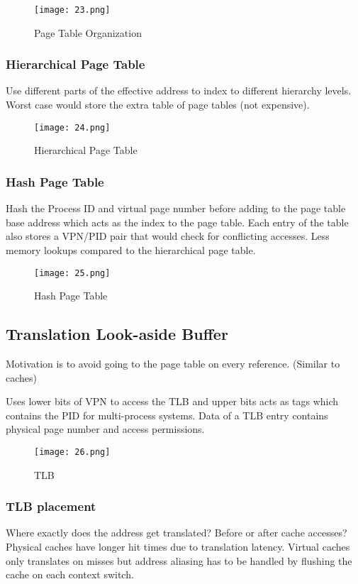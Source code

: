 \documentclass{article}
\begin{document}
\begin{multicols*}{2}
\begin{figure}[H]
    \centering
    {\texttt{[image: 23.png]}}
  \caption{Page Table Organization}
\end{figure}

\subsubsection*{Hierarchical Page Table}
Use different parts of the effective address to index to different hierarchy levels. Worst case would store the extra table of page tables (not expensive).

\begin{figure}[H]
    \centering
    {\texttt{[image: 24.png]}}
  \caption{Hierarchical Page Table}
\end{figure}

\subsubsection*{Hash Page Table}
Hash the Process ID and virtual page number before adding to the page table base address which acts as the index to the page table. Each entry of the table also stores a VPN/PID pair that would check for conflicting accesses. Less memory lookups compared to the hierarchical page table.

\begin{figure}[H]
    \centering
    {\texttt{[image: 25.png]}}
  \caption{Hash Page Table}
\end{figure}

\subsection*{Translation Look-aside Buffer}
Motivation is to avoid going to the page table on every reference. (Similar to caches)
\medskip\par\noindent
Uses lower bits of VPN to access the TLB and upper bits acts as tags which contains the PID for multi-process systems. Data of a TLB entry contains physical page number and access permissions.

\begin{figure}[H]
    \centering
    {\texttt{[image: 26.png]}}
  \caption{TLB}
\end{figure}

\subsubsection*{TLB placement}
Where exactly does the address get translated? Before or after cache accesses? Physical caches have longer hit times due to translation latency. Virtual caches only translates on misses but address aliasing has to be handled by flushing the cache on each context switch.


\end{multicols*}
\end{document}
